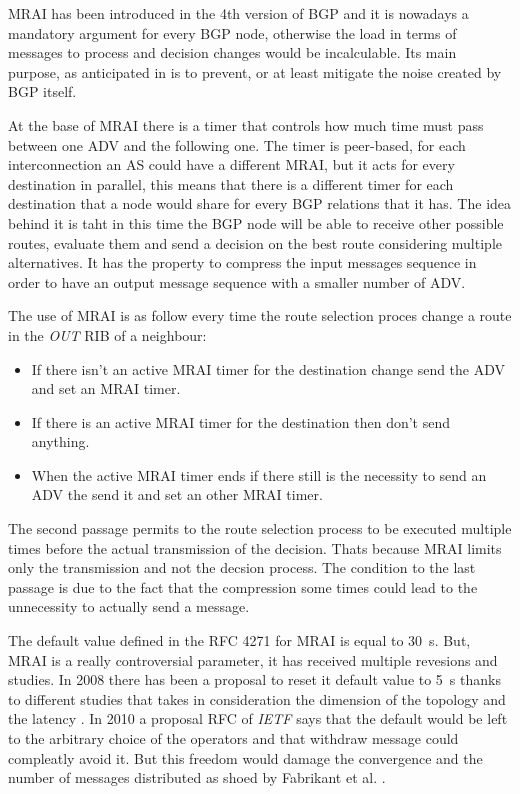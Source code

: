\ac{MRAI} has been introduced in the \num{4}th version of \ac{BGP} \cite{rfc4271} and
it is nowadays a mandatory argument for every \ac{BGP} node, otherwise the load
in terms of messages to process and decision changes would be incalculable.
Its main purpose, as anticipated in  is to prevent, or
at least mitigate the noise created by \ac{BGP} itself.

At the base of \ac{MRAI} there is a timer that controls how much time must pass
between one \ac{ADV} and the following one.
The timer is peer-based, for each interconnection an \ac{AS} could have a different
\ac{MRAI}, but it acts for every destination in parallel, this means that there 
is a different timer for each destination that a node would share for every 
\ac{BGP} relations that it has.
The idea behind it is taht in this time the \ac{BGP} node will be able
to receive other possible routes, evaluate them and send a decision on the 
best route considering multiple alternatives.
It has the property to compress the input messages sequence in order to have
an output message sequence with a smaller number of \ac{ADV}.

The use of \ac{MRAI} is as follow every time the route selection proces change
a route in the \textit{OUT} \ac{RIB} of a neighbour:
\begin{itemize}
	\item If there isn't an active \ac{MRAI} timer for the destination change
		send the \ac{ADV} and set an \ac{MRAI} timer.
	\item If there is an active \ac{MRAI} timer for the destination then 
		don't send anything.
	\item When the active \ac{MRAI} timer ends if there still is the necessity
		to send an \ac{ADV} the send it and set an other \ac{MRAI} timer.
\end{itemize}

The second passage permits to the route selection process to be executed multiple
times before the actual transmission of the decision.
Thats because \ac{MRAI} limits only the transmission and not the decsion process.
The condition to the last passage is due to the fact that the compression some
times could lead to the unnecessity to actually send a message.

The default value defined in the \ac{RFC} \num{4271} for \ac{MRAI} is equal to
\SI{30}{\second}.
But, \ac{MRAI} is a really controversial parameter, it has received multiple
revesions and studies.
In \num{2008} there has been a proposal to reset it default value to \SI{5}{\second}
\cite{jakma2008revised} thanks to different studies that takes in consideration
the dimension of the topology and the latency \cite{qiu2005optimal}.
In \num{2010} a proposal \ac{RFC} of \textit{IETF} \cite{jakma2010revisions} 
says that the default would be left to the arbitrary choice of the operators and
that withdraw message could compleatly avoid it.
But this freedom would damage the convergence and the number of messages distributed
as shoed by Fabrikant et al. \cite{fabrikant2011there}.

